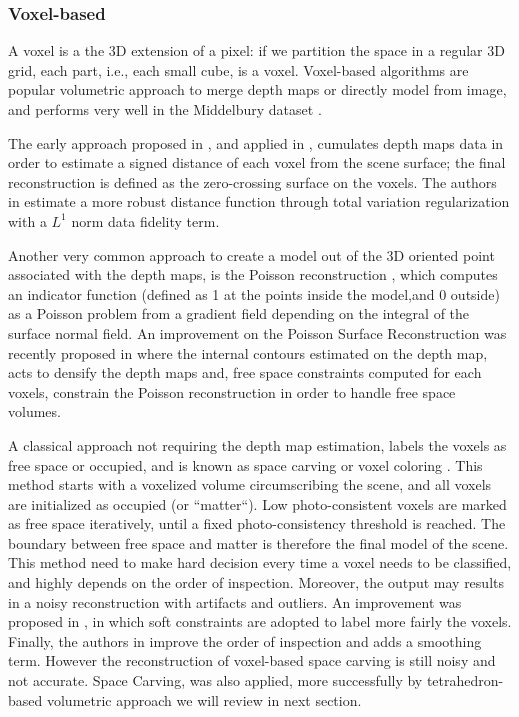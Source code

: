 \subsubsection{Voxel-based}
A voxel is a the 3D extension of a pixel: if we partition the space in a regular 3D grid, each part, i.e., each small cube, is a voxel.
Voxel-based  algorithms are popular volumetric approach to merge depth maps or directly model from image, and performs very well in the Middelbury dataset \cite{Seitz_et_al06}.

The early approach proposed in \cite{curless1996volumetric}, and applied in \cite{goesele2006multi}, cumulates depth maps data in order to estimate a signed distance of each voxel from the scene surface; the final reconstruction is defined as the zero-crossing surface on the voxels.
The authors in \cite{zach2007globally} estimate a more robust distance function through total variation regularization with a $L^1$ norm data fidelity term.

Another very common approach to create a model out of the 3D oriented point associated with the depth maps, is the Poisson reconstruction \cite{kazhdan2006poisson}, which computes an indicator function (defined as 1 at the points inside the model,and 0  outside) as a Poisson problem from a gradient field depending on the integral of the surface normal field.
An improvement on the Poisson Surface Reconstruction was recently proposed in \cite{shan2014occluding} where the internal contours estimated on the depth map, acts to densify the depth maps and, free space constraints computed for each voxels, constrain the Poisson reconstruction in order to handle free space volumes.

A classical approach not requiring the depth map estimation, labels the voxels as free space or occupied, and is known as space carving or voxel coloring \cite{seitz1999photorealistic,kutulakos_seitz05}. 
This method starts with a voxelized volume circumscribing the scene, and all voxels are initialized as occupied (or ``matter``). Low photo-consistent voxels are marked as free space iteratively, until a fixed photo-consistency threshold is reached. The boundary between free space and matter is therefore the final model of the scene. 
This method need to make hard decision every time a voxel needs to be classified, and highly depends on the order of inspection. Moreover, the output may results in a noisy reconstruction with artifacts and outliers.
An improvement was proposed in \cite{broadhurst2001probabilistic}, in which soft constraints are adopted to label more fairly the voxels.
Finally, the authors in \cite{yang2003multi} improve the order of inspection and adds a smoothing term. 
However the reconstruction of voxel-based space carving is still noisy and not  accurate.
Space Carving, was also applied, more successfully by tetrahedron-based volumetric approach we will  review in next section.


